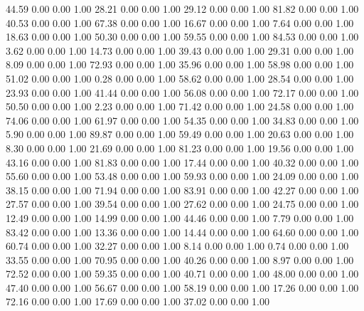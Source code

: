    44.59   0.00   0.00   1.00
   28.21   0.00   0.00   1.00
   29.12   0.00   0.00   1.00
   81.82   0.00   0.00   1.00
   40.53   0.00   0.00   1.00
   67.38   0.00   0.00   1.00
   16.67   0.00   0.00   1.00
    7.64   0.00   0.00   1.00
   18.63   0.00   0.00   1.00
   50.30   0.00   0.00   1.00
   59.55   0.00   0.00   1.00
   84.53   0.00   0.00   1.00
    3.62   0.00   0.00   1.00
   14.73   0.00   0.00   1.00
   39.43   0.00   0.00   1.00
   29.31   0.00   0.00   1.00
    8.09   0.00   0.00   1.00
   72.93   0.00   0.00   1.00
   35.96   0.00   0.00   1.00
   58.98   0.00   0.00   1.00
   51.02   0.00   0.00   1.00
    0.28   0.00   0.00   1.00
   58.62   0.00   0.00   1.00
   28.54   0.00   0.00   1.00
   23.93   0.00   0.00   1.00
   41.44   0.00   0.00   1.00
   56.08   0.00   0.00   1.00
   72.17   0.00   0.00   1.00
   50.50   0.00   0.00   1.00
    2.23   0.00   0.00   1.00
   71.42   0.00   0.00   1.00
   24.58   0.00   0.00   1.00
   74.06   0.00   0.00   1.00
   61.97   0.00   0.00   1.00
   54.35   0.00   0.00   1.00
   34.83   0.00   0.00   1.00
    5.90   0.00   0.00   1.00
   89.87   0.00   0.00   1.00
   59.49   0.00   0.00   1.00
   20.63   0.00   0.00   1.00
    8.30   0.00   0.00   1.00
   21.69   0.00   0.00   1.00
   81.23   0.00   0.00   1.00
   19.56   0.00   0.00   1.00
   43.16   0.00   0.00   1.00
   81.83   0.00   0.00   1.00
   17.44   0.00   0.00   1.00
   40.32   0.00   0.00   1.00
   55.60   0.00   0.00   1.00
   53.48   0.00   0.00   1.00
   59.93   0.00   0.00   1.00
   24.09   0.00   0.00   1.00
   38.15   0.00   0.00   1.00
   71.94   0.00   0.00   1.00
   83.91   0.00   0.00   1.00
   42.27   0.00   0.00   1.00
   27.57   0.00   0.00   1.00
   39.54   0.00   0.00   1.00
   27.62   0.00   0.00   1.00
   24.75   0.00   0.00   1.00
   12.49   0.00   0.00   1.00
   14.99   0.00   0.00   1.00
   44.46   0.00   0.00   1.00
    7.79   0.00   0.00   1.00
   83.42   0.00   0.00   1.00
   13.36   0.00   0.00   1.00
   14.44   0.00   0.00   1.00
   64.60   0.00   0.00   1.00
   60.74   0.00   0.00   1.00
   32.27   0.00   0.00   1.00
    8.14   0.00   0.00   1.00
    0.74   0.00   0.00   1.00
   33.55   0.00   0.00   1.00
   70.95   0.00   0.00   1.00
   40.26   0.00   0.00   1.00
    8.97   0.00   0.00   1.00
   72.52   0.00   0.00   1.00
   59.35   0.00   0.00   1.00
   40.71   0.00   0.00   1.00
   48.00   0.00   0.00   1.00
   47.40   0.00   0.00   1.00
   56.67   0.00   0.00   1.00
   58.19   0.00   0.00   1.00
   17.26   0.00   0.00   1.00
   72.16   0.00   0.00   1.00
   17.69   0.00   0.00   1.00
   37.02   0.00   0.00   1.00
